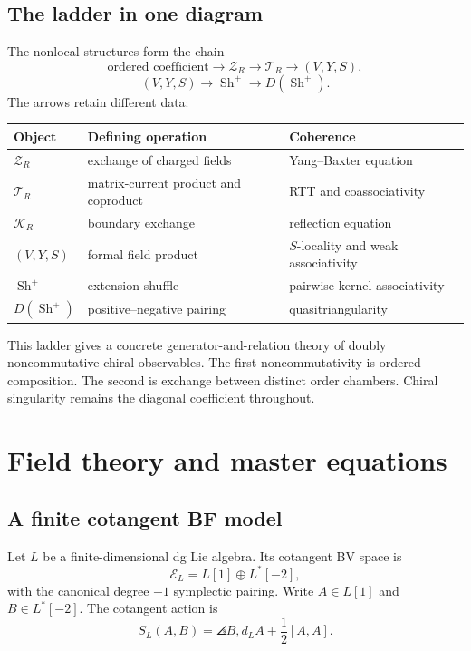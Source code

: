 \chapter{The ladder in one diagram}
The nonlocal structures form the chain
\[
\text{ordered coefficient}
\longrightarrow \mathcal Z_R
\longrightarrow \mathcal T_R
\longrightarrow (V,Y,S),
\]
\[
(V,Y,S)
\longrightarrow \operatorname{Sh}^{+}
\longrightarrow D\!\left(\operatorname{Sh}^{+}\right).
\]
The arrows retain different data:
\begin{center}
\small
\begin{tabularx}{0.96\textwidth}{@{}>{\raggedright\arraybackslash}p{}>{\raggedright\arraybackslash}X>{\raggedright\arraybackslash}p{}@{}}
\toprule
\textbf{Object}&\textbf{Defining operation}&\textbf{Coherence}\\
\midrule
$\mathcal Z_R$&exchange of charged fields&Yang--Baxter equation\\
$\mathcal T_R$&matrix-current product and coproduct&RTT and coassociativity\\
$\mathcal K_R$&boundary exchange&reflection equation\\
$(V,Y,S)$&formal field product&$S$-locality and weak associativity\\
$\operatorname{Sh}^{+}$&extension shuffle&pairwise-kernel associativity\\
$D(\operatorname{Sh}^{+})$&positive--negative pairing&quasitriangularity\\
\bottomrule
\end{tabularx}
\end{center}
This ladder gives a concrete generator-and-relation theory of doubly noncommutative chiral observables.  The first noncommutativity is ordered composition.  The second is exchange between distinct order chambers.  Chiral singularity remains the diagonal coefficient throughout.


\part{Field theory and master equations}

\chapter{A finite cotangent BF model}
Let $L$ be a finite-dimensional dg Lie algebra. Its cotangent BV space is
\[
 \mathcal E_L=L[1]\oplus L^*[-2],
\]
with the canonical degree $-1$ symplectic pairing. Write $A\in L[1]$ and $B\in L^*[-2]$. The cotangent action is
\[
 S_L(A,B)=\angles{B,d_LA+\frac12[A,A]}.
\]

